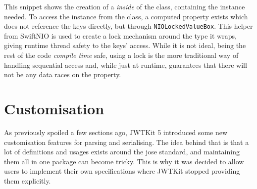 This snippet shows the creation of a  \textit{inside} of the class, containing the instance needed. To access the instance from the class, a computed property exists which does not reference the keys directly, but through \lstinline{NIOLockedValueBox}. This helper from SwiftNIO is used to create a \gls{lock} mechanism around the type it wraps, giving runtime thread safety to the keys' access. While it is not ideal, being the rest of the code \textit{compile time} safe, using a \gls{lock} is the more traditional way of handling sequential access and, while just at runtime, guarantees that there will not be any data races on the property. \cite{swiftnio-docs}

\section{Customisation}
As previously spoiled a few sections ago, JWTKit 5 introduced some new customisation features for parsing and serialising. The idea behind that is that a lot of definitions and usages exists around the \gls{jose} standard, and maintaining them all in one package can become tricky. This is why it was decided to allow users to implement their own specifications where JWTKit stopped providing them explicitly. 

